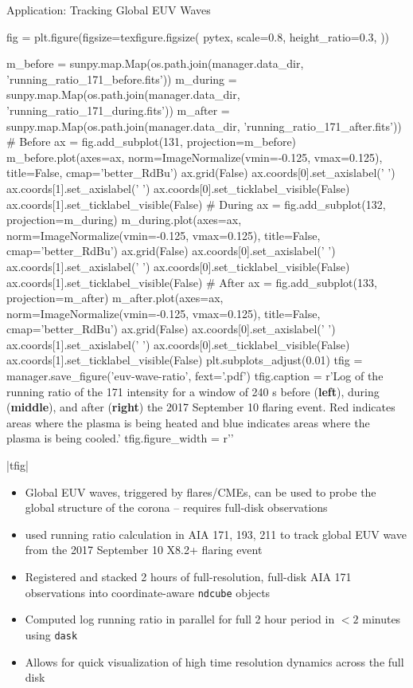 \begin{block}{Application: Tracking Global EUV Waves}

\begin{pycode}[manager]
fig = plt.figure(figsize=texfigure.figsize(
    pytex,
    scale=0.8,
    height_ratio=0.3,
))

m_before = sunpy.map.Map(os.path.join(manager.data_dir, 'running_ratio_171_before.fits'))
m_during = sunpy.map.Map(os.path.join(manager.data_dir, 'running_ratio_171_during.fits'))
m_after = sunpy.map.Map(os.path.join(manager.data_dir, 'running_ratio_171_after.fits'))
# Before
ax = fig.add_subplot(131, projection=m_before)
m_before.plot(axes=ax,
       norm=ImageNormalize(vmin=-0.125, vmax=0.125),
       title=False,
       cmap='better_RdBu')
ax.grid(False)
ax.coords[0].set_axislabel(' ')
ax.coords[1].set_axislabel(' ')
ax.coords[0].set_ticklabel_visible(False)
ax.coords[1].set_ticklabel_visible(False)
# During
ax = fig.add_subplot(132, projection=m_during)
m_during.plot(axes=ax,
       norm=ImageNormalize(vmin=-0.125, vmax=0.125),
       title=False,
       cmap='better_RdBu')
ax.grid(False)
ax.coords[0].set_axislabel(' ')
ax.coords[1].set_axislabel(' ')
ax.coords[0].set_ticklabel_visible(False)
ax.coords[1].set_ticklabel_visible(False)
# After
ax = fig.add_subplot(133, projection=m_after)
m_after.plot(axes=ax,
       norm=ImageNormalize(vmin=-0.125, vmax=0.125),
       title=False,
       cmap='better_RdBu')
ax.grid(False)
ax.coords[0].set_axislabel(' ')
ax.coords[1].set_axislabel(' ')
ax.coords[0].set_ticklabel_visible(False)
ax.coords[1].set_ticklabel_visible(False)
plt.subplots_adjust(0.01)
tfig = manager.save_figure('euv-wave-ratio', fext='.pdf')
tfig.caption = r'Log of the running ratio of the 171 \angstrom{} intensity for a window of 240 s before (\textbf{left}), during (\textbf{middle}), and after (\textbf{right}) the 2017 September 10 flaring event. Red indicates areas where the plasma is being heated and blue indicates areas where the plasma is being cooled.'
tfig.figure_width = r'\columnwidth'
\end{pycode}
\py[manager]|tfig|

\begin{itemize}
    \item Global EUV waves, triggered by flares/CMEs, can be used to probe the global structure of the corona -- \alert{requires full-disk observations}
    \item \citet{liu_truly_2018} used running ratio calculation in AIA 171, 193, 211 \angstrom{} to track global EUV wave from the 2017 September 10 X8.2+ flaring event
    \item Registered and stacked 2 hours of full-resolution, full-disk AIA 171 \angstrom{} observations into coordinate-aware \texttt{ndcube} objects
    \item \alert{Computed log running ratio in parallel for full 2 hour period in $<2$ minutes using \texttt{dask}}
    \item Allows for quick visualization of high time resolution dynamics across the full disk
\end{itemize}

\end{block}

